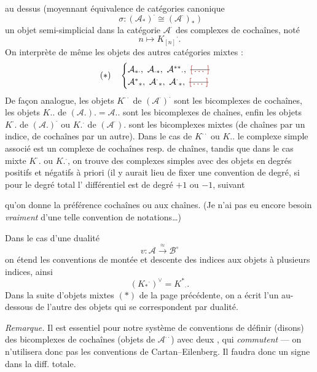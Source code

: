 \documentclass[11pt,a4paper]{article}
\begin{document}
\ill{} au dessus (moyennant équivalence de catégories canonique
\[
  \sigma : (\mathcal{A}_{*})^{\cdot} \cong (\mathcal{A}^{\cdot})_{*} \;)
\]
un objet semi-simplicial dans la catégorie $\mathcal{A}^{\cdot}$ des complexes de
cochaînes, noté
\[
  n \longmapsto K_{[n]}{}^{\cdot} .
\]
On interprète de même les objets des autres catégories mixtes
\struck{\ill{}} :
\[
  (*) \quad
  \begin{cases}
    \mathcal{A}_{*\cdot}, \ \mathcal{A}_{\cdot *}, \ \mathcal{A}^{**}{}_{\cdot}, \ \text{\struck{\ill{}}} \\
    \mathcal{A}^{*}{}_{*}, \ \mathcal{A}^{\cdot}{}_{*}, \ \mathcal{A}^{\cdot}{}_{*}, \ \text{\struck{\ill{}}}
  \end{cases}
\]
De façon analogue, les objets $K^{\cdot\cdot}$ de $(\mathcal{A}^{\cdot})^{\cdot}$
sont les bicomplexes de cochaînes, les objets $K..$ de
$(\mathcal{A}.). = \mathcal{A}..$ sont les bicomplexes de chaînes, enfin les objets
$K^{\cdot}.$ de $(\mathcal{A}.)^{\cdot}$ ou $K.^{\cdot}$ de $(\mathcal{A}^{\cdot}).$
sont les bicomplexes mixtes  (de chaînes par un indice, de
cochaînes par un autre). Dans le cas de $K^{\cdot\cdot}$ ou $K..$ le complexe simple
associé est un complexe de cochaînes resp. de chaînes, tandis que dans le cas mixte
$K^{\cdot}.$ ou $K.^{\cdot}$, on trouve des complexes simples avec des objets en
degrés positifs et négatifs à priori (il y aurait lieu de fixer une convention de
degré, si pour le degré total l' différentiel est de degré
$+1$ ou $-1$, suivant

qu'on donne la préférence \struck{\ill{}} cochaînes ou aux chaînes. (Je n'ai pas eu
encore besoin \emph{vraiment} d'une telle convention de notations…)

Dans le cas d'une dualité
\[
  v : \mathcal{A} \xrightarrow{\ \approx\ } \mathcal{B}^{\circ}
\]
on étend les conventions de montée et descente des indices aux objets à plusieurs
indices, ainsi
\[
  (K_{*}{}^{\cdot})^{\vee} = K^{*}{}_{\cdot} .
\]
Dans la suite d'objets mixtes $(*)$ de la page précédente, on a écrit l'un au-dessous
de l'autre des objets qui se correspondent par dualité.

\textit{Remarque.} Il est essentiel pour notre système de conventions de définir
(disons) des bicomplexes de cochaînes (objets de $\mathcal{A}^{\cdot\cdot}$) avec
deux  \ill{}, qui \emph{commutent} --- on n'utilisera donc
pas les conventions de Cartan--Eilenberg. Il faudra donc un signe dans la diff.
totale.
\end{document}
